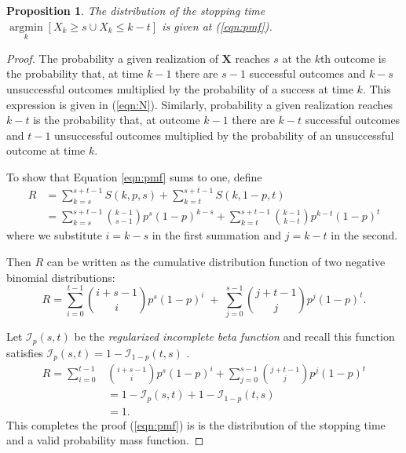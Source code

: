 \documentclass[review]{elsarticle}
\DeclareMathOperator*{\argmin}{argmin}
\newcommand*{\argminl}{\argmin\limits}
\newtheorem{prop}{Proposition}
\begin{document}
\begin{prop}
The distribution of the stopping time
$\argminl_k \left[X_k \geq s \cup X_k \leq k-t \right]$
is given at (\ref{eqn:pmf}).
\end{prop}
\begin{proof}

The probability a given realization of $\mathbf{X}$ reaches $s$ at
the $k$th outcome is the probability that, at time $k-1$ there are $s-1$
successful outcomes and $k-s$ unsuccessful outcomes multiplied by
the probability of a success at time $k$. This expression is given
in (\ref{eqn:N}). 
Similarly, probability a given realization reaches $k-t$
is the probability that, at outcome $k-1$ there are $k-t$ successful outcomes
and $t-1$ unsuccessful outcomes multiplied by the probability of an
unsuccessful outcome at time $k$.  


To show that Equation \ref{eqn:pmf} sums to one, define
\begin{align} \label{eqn:sum_proof}
R &= \sum_{k=s}^{s+t-1} S(k, p, s) + \sum_{k=t}^{s+t-1} S(k, 1-p, t) \\
  &= \sum_{k=s}^{s+t-1} {k-1 \choose s-1} p^s (1-p)^{k-s} + \sum_{k=t}^{s+t-1} {k-1 \choose k-t} p^{k-t} (1-p)^t
\end{align}
where we substitute $i=k-s$ in the first summation and $j=k-t$ in the second.

Then $R$ can be written as the cumulative distribution function of two
negative binomial distributions:
\begin{equation} \label{eqn:transformed_sum}
R = \sum_{i=0}^{t-1} {i+s-1 \choose i} p^s (1-p)^i \; + \;
\sum_{j=0}^{s-1} {j+t-1 \choose j} p^j (1-p)^t.
\end{equation}

Let $\mathcal{I}_p(s, t)$ be the {\em regularized incomplete beta function} 
\citep{Olver2010} and recall this function satisfies 
$\mathcal{I}_p(s, t) = 1-\mathcal{I}_{1-p}(t, s)$ \citep{Abramowitz1964}.
\begin{align*}
R = \sum_{i=0}^{t-1} &{i+s-1 \choose i} p^s (1-p)^i +
\sum_{j=0}^{s-1}  {j+t-1 \choose j} p^j  (1-p)^t \\
   &= 1-\mathcal{I}_p(s, t) + 1 - \mathcal{I}_{1-p}(t, s) \\
   &= 1. 
\end{align*}
This completes the proof (\ref{eqn:pmf}) is is the distribution of the
stopping time and a valid probability mass
function.
\end{proof}
\end{document}
